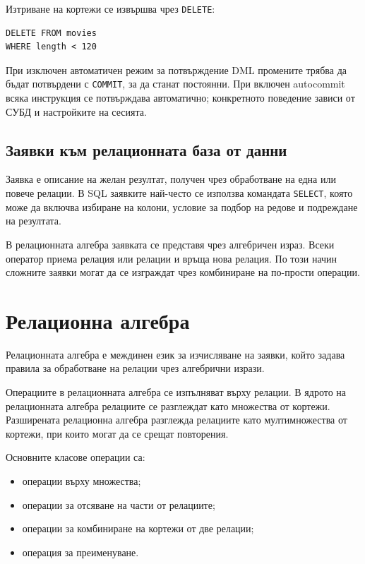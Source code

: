 Изтриване на кортежи се извършва чрез \texttt{DELETE}:

\begin{verbatim}
DELETE FROM movies
WHERE length < 120
\end{verbatim}

При изключен автоматичен режим за потвърждение DML промените трябва да бъдат потвърдени с \texttt{COMMIT}, за да станат постоянни. При включен autocommit всяка инструкция се потвърждава автоматично; конкретното поведение зависи от СУБД и настройките на сесията.

\subsection{Заявки към релационната база от данни}\label{s:23.3.3}

Заявка е описание на желан резултат, получен чрез обработване на една или повече релации. В SQL заявките най-често се използва командата \texttt{SELECT}, която може да включва избиране на колони, условие за подбор на редове и подреждане на резултата.

В релационната алгебра заявката се представя чрез алгебричен израз. Всеки оператор приема релация или релации и връща нова релация. По този начин сложните заявки могат да се изграждат чрез комбиниране на по-прости операции.

\section{Релационна алгебра}\label{s:23.4}

\begin{defn}
Релационната алгебра е междинен език за изчисляване на заявки, който задава правила за обработване на релации чрез алгебрични изрази.
\end{defn}

Операциите в релационната алгебра се изпълняват върху релации. В ядрото на релационната алгебра релациите се разглеждат като множества от кортежи. Разширената релационна алгебра разглежда релациите като мултимножества от кортежи, при които могат да се срещат повторения.

Основните класове операции са:

\begin{itemize}
    \item операции върху множества;
    \item операции за отсяване на части от релациите;
    \item операции за комбиниране на кортежи от две релации;
    \item операция за преименуване.
\end{itemize}

